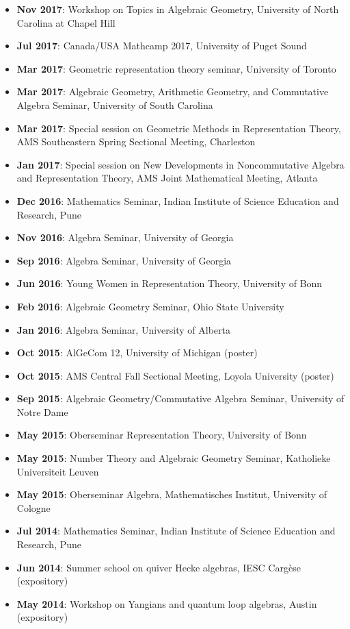 \documentclass[a4paper]{moderncv}
\begin{document}
\begin{itemize}
\item \textbf{Nov 2017}: Workshop on Topics in Algebraic Geometry, University of North Carolina at Chapel Hill
\item \textbf{Jul 2017}: Canada/USA Mathcamp 2017, University of Puget Sound
\item \textbf{Mar 2017}: Geometric representation theory seminar, University of Toronto
\item \textbf{Mar 2017}: Algebraic Geometry, Arithmetic Geometry, and Commutative Algebra Seminar, University of South Carolina
\item \textbf{Mar 2017}: Special session on Geometric Methods in Representation Theory, AMS Southeastern Spring Sectional Meeting, Charleston
\item \textbf{Jan 2017}: Special session on New Developments in Noncommutative Algebra and Representation Theory, AMS Joint Mathematical Meeting, Atlanta
\item \textbf{Dec 2016}: Mathematics Seminar, Indian Institute of Science Education and Research, Pune
\item \textbf{Nov 2016}: Algebra Seminar, University of Georgia
\item \textbf{Sep 2016}: Algebra Seminar, University of Georgia
\item \textbf{Jun 2016}: Young Women in Representation Theory, University of Bonn
\item \textbf{Feb 2016}: Algebraic Geometry Seminar, Ohio State University
\item \textbf{Jan 2016}: Algebra Seminar, University of Alberta
\item \textbf{Oct 2015}: AlGeCom 12, University of Michigan (poster)
\item \textbf{Oct 2015}: AMS Central Fall Sectional Meeting, Loyola University (poster)
\item \textbf{Sep 2015}: Algebraic Geometry/Commutative Algebra Seminar, University of Notre Dame
\item \textbf{May 2015}: Oberseminar Representation Theory, University of Bonn
\item \textbf{May 2015}: Number Theory and Algebraic Geometry Seminar, Katholieke Universiteit Leuven
\item \textbf{May 2015}: Oberseminar Algebra, Mathematisches Institut, University of Cologne
\item \textbf{Jul 2014}: Mathematics Seminar, Indian Institute of Science Education and Research, Pune
\item \textbf{Jun 2014}: Summer school on quiver Hecke algebras, IESC Cargèse (expository)
\item \textbf{May 2014}: Workshop on Yangians and quantum loop algebras, Austin (expository)
\end{itemize}
\end{document}
